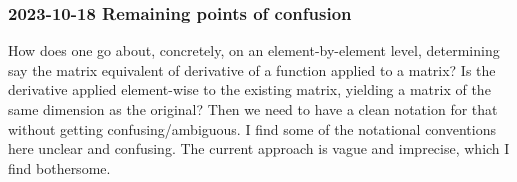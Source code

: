 \documentclass{article}
\begin{document}
\subsubsection{2023-10-18 Remaining points of confusion} How does one go about, concretely, on an element-by-element
level, determining say the matrix equivalent of derivative of a function applied to a matrix? 
Is the derivative applied element-wise to the existing matrix, yielding a matrix of the same dimension as the original?
Then we need to have a clean notation for that without getting confusing/ambiguous. I find some of the notational
conventions here unclear and confusing. The current approach is vague and imprecise, which I find bothersome.
\end{document}
